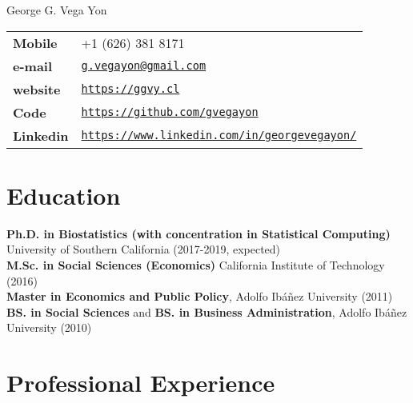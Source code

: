 \documentclass[letterpaper, 11pt]{article}
\def\name{George G. Vega Yon}
\renewenvironment{itemize}{
  \begin{list}{}{
    \setlength{\leftmargin}{0.45cm}
  }
}{
  \end{list}
}
\begin{document}
{\huge \name}


\vspace{0.25in}

\begin{minipage}{0.45\linewidth}
  \begin{tabular}{>{\bfseries}p{4cm}l}
    Mobile & +1 (626) 381 8171 \\
    e-mail & \href{mailto:g.vegayon@gmail.com}{\tt g.vegayon@gmail.com} \\
    website & \href{https://ggvy.cl}{\tt https://ggvy.cl} \\
    Code & \href{https://github.com/gvegayon}{\tt https://github.com/gvegayon}\\
    Linkedin & \href{https://www.linkedin.com/in/georgevegayon/}{\tt https://www.linkedin.com/in/georgevegayon/}
  \end{tabular}
\end{minipage}

\section*{Education}

\begin{itemize}
\item 
{\bf Ph.D. in Biostatistics (with concentration in Statistical Computing)} University of Southern California (2017-2019, expected) \\
{\bf M.Sc. in Social Sciences (Economics)} California Institute of Technology (2016) \\
{\bf Master in Economics and Public Policy}, Adolfo Ib\'a\~nez University (2011) \\
{\bf BS. in Social Sciences} and {\bf BS. in Business Administration}, Adolfo Ib\'a\~nez University (2010)
\end{itemize}

\section*{Professional Experience}
\end{document}
